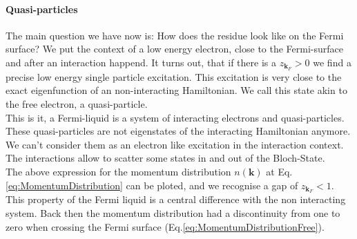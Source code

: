 \documentclass[../main.tex]{subfile}
\begin{document}
\paragraph{Quasi-particles}
The main question we have now is: How does the residue look like on the Fermi surface? We put the context of a low energy electron, close to the Fermi-surface and 
after an interaction happend. It turns out, that if there is a $z_{\bm{k}_F}>0$ we find a precise low energy single particle excitation. This excitation is very close
to the exact eigenfunction of an non-interacting Hamiltonian. We call this state akin to the free electron, a quasi-particle.\\

This is it, a Fermi-liquid is a system of interacting electrons and quasi-particles. These quasi-particles are not eigenstates of the interacting Hamiltonian anymore.
We can't consider them as an electron like excitation in the interaction context.
The interactions allow to scatter some states in and out of the Bloch-State.\\

The above expression for the momentum distribution $n(\bm{k})$ at Eq.\ref{eq:MomentumDistribution} can be ploted, and we recognise a gap of $z_{\bm{k}_F}<1$. 
 This property of the Fermi liquid is a central difference with the non interacting
system. Back then the momentum distribution had a discontinuity from one to zero when crossing the Fermi surface (Eq.\ref{eq:MomentumDistributionFree}).\\
\end{document}
